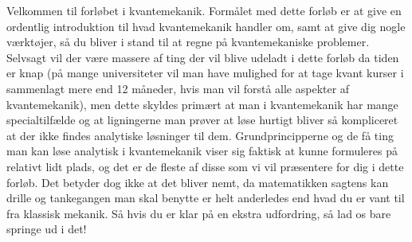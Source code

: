 \documentclass[../Kvantemekanik.tex]{subfiles}
\begin{document}
Velkommen til forløbet i kvantemekanik. Formålet med dette forløb er at give en ordentlig introduktion til hvad kvantemekanik handler om, samt at give dig nogle værktøjer, så du bliver i stand til at regne på kvantemekaniske problemer. Selvsagt vil der være massere af ting der vil blive udeladt i dette forløb da tiden er knap (på mange universiteter vil man have mulighed for at tage kvant kurser i sammenlagt mere end 12 måneder, hvis man vil forstå alle aspekter af kvantemekanik), men dette skyldes primært at man i kvantemekanik har mange specialtilfælde og at ligningerne man prøver at løse hurtigt bliver så kompliceret at der ikke findes analytiske løsninger til dem. Grundprincipperne og de få ting man kan løse analytisk i kvantemekanik viser sig faktisk at kunne formuleres på relativt lidt plads, og det er de fleste af disse som vi vil præsentere for dig i dette forløb. Det betyder dog ikke at det bliver nemt, da matematikken sagtens kan drille og tankegangen man skal benytte er helt anderledes end hvad du er vant til fra klassisk mekanik. Så hvis du er klar på en ekstra udfordring, så lad os bare springe ud i det!

 
\end{document}
